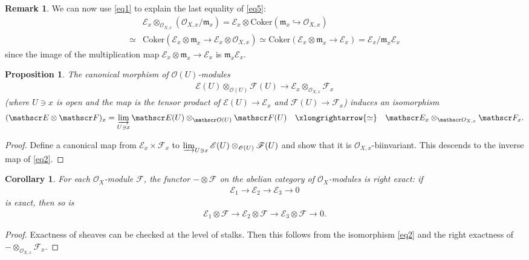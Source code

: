 \documentclass[12pt,b5paper,notitlepage]{report}
\theoremstyle{definition}
\newtheorem{rem}[df]{Remark}
\theoremstyle{plain}
\newtheorem{pp}[df]{Proposition}
\newtheorem{co}[df]{Corollary}
\newcommand{\fk}{\mathfrak}
\newcommand{\scr}{\mathscr}
\newcommand{\Cok}{\mathrm{Coker}}
\numberwithin{equation}{section}
\begin{document}
\begin{rem}\label{lb4}
We can now use \eqref{eq1} to explain the last equality of \eqref{eq5}:
\begin{align*}
&\scr E_x\otimes_{\scr O_{X,x}}(\scr O_{X,x}/\fk m_x)=\scr E_x\otimes \Cok(\fk m_x\hookrightarrow \scr O_{X,x})\\
\simeq&\Cok(\scr E_x\otimes\fk m_x\rightarrow \scr E_x\otimes\scr O_{X,x})\simeq\Cok(\scr E_x\otimes\fk m_x\rightarrow \scr E_x)=\scr E_x/{\fk m_x\scr E_x}
\end{align*}
since the image of the multiplication map $\scr E_x\otimes\fk m_x\rightarrow \scr E_x$ is $\fk m_x\scr E_x$.
\end{rem}


\begin{pp}
The canonical morphism of $\scr O(U)$-modules
\begin{align*}
\scr E(U)\otimes_{\scr O(U)}\scr F(U)\rightarrow\scr E_x\otimes_{\scr O_{X,x}}\scr F_x
\end{align*}
(where $U\ni x$ is open and the map is the tensor product of $\scr E(U)\rightarrow\scr E_x$ and $\scr F(U)\rightarrow\scr F_x$) induces an isomorphism
\begin{align}
(\scr E\otimes\scr F)_x=\varinjlim_{U\ni x}\scr E(U)\otimes_{\scr O(U)}\scr F(U)\quad\xlongrightarrow{\simeq}\quad\scr E_x\otimes_{\scr O_{X,x}}\scr F_x.\label{eq2}
\end{align}
\end{pp}
\begin{proof}
Define a canonical map from $\scr E_x\times\scr F_x$ to $\varinjlim_{U\ni x}\scr E(U)\otimes_{\scr O(U)}\scr F(U)$ and show that it is $\scr O_{X,x}$-biinvariant.  This descends to the inverse map of \eqref{eq2}.
\end{proof}

\begin{co}\label{lb44}
For each $\scr O_X$-module $\scr F$, the functor $-\otimes\scr F$ on the abelian category of $\scr O_X$-modules is right exact: if
\begin{align*}
\scr E_1\rightarrow\scr E_2\rightarrow\scr E_3\rightarrow 0
\end{align*}
is exact, then so is
\begin{align*}
\scr E_1\otimes\scr F\rightarrow\scr E_2\otimes\scr F\rightarrow\scr E_3\otimes\scr F\rightarrow 0.
\end{align*}
\end{co}

\begin{proof}
Exactness of sheaves can be checked at the level of stalks. Then this follows from the isomorphism \eqref{eq2} and the right exactness of $-\otimes_{\scr O_{X,x}}\scr F_x$.
\end{proof}
\end{document}
